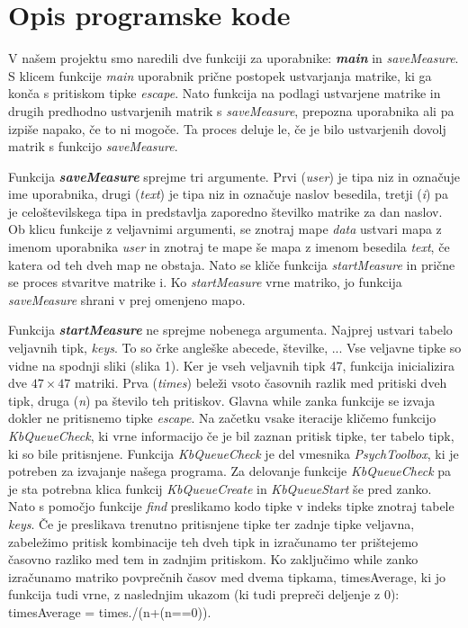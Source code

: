 \documentclass[12pt]{article}
\begin{document}
\section{Opis programske kode}
V našem projektu smo naredili dve funkciji za uporabnike: \textbf{\textit{main}} in \textit{saveMeasure}. 
S klicem funkcije \textit{main} uporabnik prične postopek ustvarjanja matrike, ki ga konča s pritiskom 
tipke \textit{escape}. Nato funkcija na podlagi ustvarjene matrike in drugih predhodno ustvarjenih matrik s 
\textit{saveMeasure}, prepozna uporabnika ali pa izpiše napako, če to ni mogoče. Ta proces deluje le, če je bilo 
ustvarjenih dovolj matrik s funkcijo \textit{saveMeasure}.

Funkcija \textbf{\textit{saveMeasure}} sprejme tri argumente. 
Prvi (\textit{user}) je tipa niz in označuje ime uporabnika, drugi (\textit{text}) je tipa niz in označuje naslov 
besedila, tretji (\textit{i}) pa je celoštevilskega tipa in predstavlja zaporedno številko matrike za dan naslov. 
Ob klicu funkcije z veljavnimi argumenti, se znotraj mape \textit{data} ustvari mapa z imenom uporabnika \textit{user} 
in znotraj te mape še mapa z imenom besedila \textit{text}, če katera od teh dveh map ne obstaja. 
Nato se kliče funkcija \textit{startMeasure} in prične se proces stvaritve matrike i. Ko \textit{startMeasure} 
vrne matriko, jo funkcija\textit{ saveMeasure} shrani v prej omenjeno mapo.

Funkcija \textbf{\textit{startMeasure}} ne sprejme nobenega argumenta.
Najprej ustvari tabelo veljavnih tipk, \textit{keys}.
To so črke angleške abecede, številke, ... Vse veljavne tipke so vidne na spodnji sliki (slika 1).
Ker je vseh veljavnih tipk 47, funkcija inicializira dve $47\times 47$ matriki. 
Prva (\textit{times}) beleži vsoto časovnih razlik med pritiski dveh tipk, druga (\textit{n}) pa število teh pritiskov. 
Glavna while zanka funkcije se izvaja dokler ne pritisnemo tipke \textit{escape}. 
Na začetku vsake iteracije kličemo funkcijo \textit{KbQueueCheck}, ki vrne informacijo če je bil zaznan pritisk tipke, 
ter tabelo tipk, ki so bile pritisnjene. Funkcija \textit{KbQueueCheck} je del vmesnika \textit{PsychToolbox}, 
ki je potreben za izvajanje našega programa. Za delovanje funkcije \textit{KbQueueCheck} pa je sta potrebna klica 
funkcij \textit{KbQueueCreate} in \textit{KbQueueStart} še pred zanko. Nato s pomočjo funkcije \textit{find} 
preslikamo kodo tipke v indeks tipke znotraj tabele \textit{keys}. Če je preslikava trenutno pritisnjene tipke 
ter zadnje tipke veljavna, zabeležimo pritisk kombinacije teh dveh tipk in izračunamo ter prištejemo časovno 
razliko med tem in zadnjim pritiskom. Ko zaključimo while zanko izračunamo matriko povprečnih časov med dvema 
tipkama, timesAverage, ki jo funkcija tudi vrne, z naslednjim ukazom (ki tudi prepreči deljenje z 0): 
timesAverage = times./(n+(n==0)).
\end{document}
